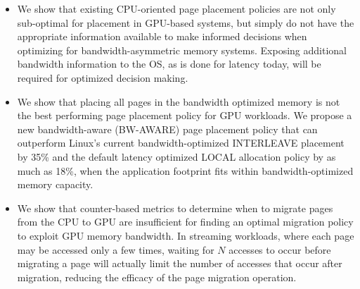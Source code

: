 \begin{itemize}
\item
We show that existing CPU-oriented page placement policies are not only 
sub-optimal for placement in GPU-based systems, but simply do not have the 
appropriate information available to make informed decisions when optimizing for 
bandwidth-asymmetric memory systems. Exposing additional bandwidth information 
to the OS, as is done for latency today, will be required for optimized decision 
making.

\item
We show that placing all pages in the bandwidth optimized memory is not the best
performing page placement policy for GPU workloads.  We propose a new
bandwidth-aware (BW-AWARE) page placement policy that can outperform Linux's
current bandwidth-optimized INTERLEAVE placement by 35\% and the default latency
optimized LOCAL allocation policy by as much as 18\%, when the application
footprint fits within bandwidth-optimized memory capacity.  


\item
We show that counter-based metrics to determine when to migrate pages from the
CPU to GPU are insufficient for finding an optimal migration policy to exploit
GPU memory bandwidth.  In streaming workloads, where each page may be accessed
only a few times, waiting for $N$ accesses to occur before migrating a page will
actually limit the number of accesses that occur after migration, reducing the
efficacy of the page migration operation.



\end{itemize}
